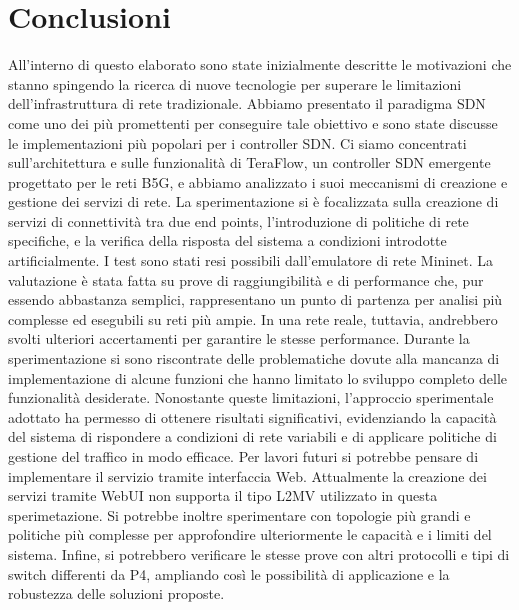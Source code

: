 \chapter{Conclusioni}
All'interno di questo elaborato sono state inizialmente descritte le motivazioni che stanno spingendo la ricerca di 
nuove tecnologie per superare le limitazioni dell'infrastruttura di rete tradizionale.
Abbiamo presentato il paradigma SDN come uno dei più promettenti per conseguire tale obiettivo e 
sono state discusse le implementazioni più popolari per i controller SDN. 
Ci siamo concentrati sull'architettura e sulle funzionalità di TeraFlow, un controller SDN emergente progettato per le reti B5G, e abbiamo analizzato i suoi meccanismi di creazione e gestione dei servizi di rete.
La sperimentazione si è focalizzata sulla creazione di servizi di connettività tra due end points, 
l'introduzione di politiche di rete specifiche, e la verifica della risposta del sistema a condizioni introdotte artificialmente.
I test sono stati resi possibili dall'emulatore di rete Mininet.
La valutazione è stata fatta su prove di raggiungibilità e di performance che, pur
essendo abbastanza semplici, rappresentano un punto di partenza per analisi più complesse ed
esegubili su reti più ampie. 
\newline In una rete reale, tuttavia, andrebbero svolti ulteriori accertamenti per garantire le stesse performance.
\newline Durante la sperimentazione si sono riscontrate delle problematiche dovute alla mancanza di implementazione
di alcune funzioni che hanno limitato lo sviluppo completo delle funzionalità desiderate.
\newline Nonostante queste limitazioni, l'approccio sperimentale adottato ha permesso di ottenere risultati significativi, 
evidenziando la capacità del sistema di rispondere a condizioni di rete variabili e di applicare politiche di gestione del traffico in modo efficace.
\newline Per lavori futuri si potrebbe pensare di implementare il servizio tramite interfaccia Web.
Attualmente la creazione dei servizi tramite WebUI non supporta il tipo L2MV utilizzato in questa sperimetazione.
\newline Si potrebbe inoltre sperimentare con topologie più grandi e politiche più complesse per approfondire ulteriormente le capacità e i limiti del sistema. 
Infine, si potrebbero verificare le stesse prove  con altri protocolli e tipi di switch differenti da P4,
ampliando così le possibilità di applicazione e la robustezza delle soluzioni proposte.
